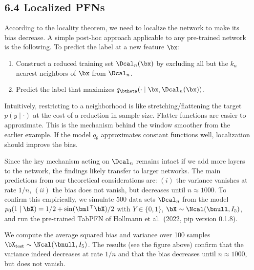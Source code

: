 \documentclass[aspectratio=169,10pt]{beamer}
\newcommand{\currentheading}{\ifx\insertsubsection\empty\insertsection\else\insertsubsection\fi}
\begin{document}
\subsection{6.4 Localized PFNs}

\begin{frame}{\currentheading}
According to the locality theorem, we need to localize the network to make its bias decrease. A simple post-hoc approach applicable to any pre-trained network is the following. To predict the label at a new feature $\bx$:
\begin{enumerate}
	\item Construct a reduced training set $\Dcal_n(\bx)$ by excluding all but the $k_n$ nearest neighbors of $\bx$ from $\Dcal_n$.
	\item Predict the label that maximizes $q_{\btheta}(\cdot \mid \bx, \Dcal_n(\bx))$.
\end{enumerate}
\end{frame}

\begin{frame}{\currentheading}
Intuitively, restricting to a neighborhood is like stretching/flattening the target $p(y \mid \cdot)$ at the cost of a reduction in sample size. Flatter functions are easier to approximate. This is the mechanism behind the window smoother from the earlier example. If the model $q_\theta$ approximates constant functions well, localization should improve the bias.
\end{frame}

\begin{frame}{\currentheading}
\small
Since the key mechanism acting on $\Dcal_n$ remains intact if we add more layers to the network, the findings likely transfer to larger networks. The main predictions from our theoretical considerations are: $(i)$ the variance vanishes at rate $1/n$, $(ii)$ the bias does not vanish, but decreases until $n \approx 1000$. To confirm this empirically, we simulate 500 data sets $\Dcal_n$ from the model $p_0(1 \mid \bX) = 1/2 + \sin(\bm 1^\top \bX) / 2$ with $Y \in \{0, 1\}$, $\bX \sim \Ncal( \bnull, I_5)$, and run the pre-trained TabPFN of Hollmann et al.\ (2022, pip version 0.1.8).
\end{frame}

\begin{frame}{\currentheading}
We compute the average squared bias and variance over 100 samples $\bX_{\text{test}} \sim \Ncal(\bnull, I_5)$. The results (see the figure above) confirm that the variance indeed decreases at rate $1/n$ and that the bias decreases until $n \approx 1000$, but does not vanish.
\end{frame}
\end{document}
